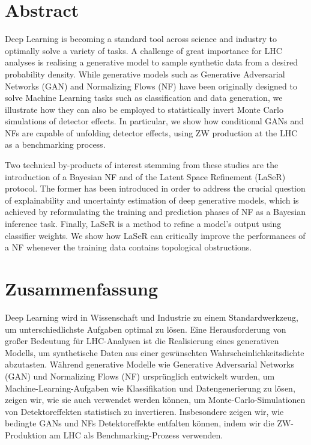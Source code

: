 %
%
\thispagestyle{empty}
%
\vspace*{1cm}
\section*{Abstract}

Deep Learning is becoming a standard tool across science and industry to optimally solve a variety of tasks.
A challenge of great importance for LHC analyses is realising a generative model to sample synthetic data from a desired probability density.
While generative models such as Generative Adversarial Networks (GAN) and Normalizing Flows (NF) have been originally designed to solve Machine Learning tasks such as classification and data generation, we illustrate how they can also be employed to statistically invert Monte Carlo simulations of detector effects. 
In particular, we show how conditional GANs and NFs are capable of unfolding detector effects, using ZW production at the LHC as a benchmarking process.

Two technical by-products of interest stemming from these studies are the introduction of a Bayesian NF and of the Latent Space Refinement (LaSeR) protocol. The former has been introduced in order to address the crucial question of explainability and uncertainty estimation of deep generative models, which is achieved by reformulating the training and prediction phases of NF as a Bayesian inference task. Finally, LaSeR is a method to refine a model's output using classifier weights. We show how LaSeR can critically improve the performances of a NF whenever the training data contains topological obstructions.

\vspace*{2.2cm}
\section*{Zusammenfassung}

Deep Learning wird in Wissenschaft und Industrie zu einem Standardwerkzeug, um unterschiedlichste Aufgaben optimal zu lösen.
Eine Herausforderung von großer Bedeutung für LHC-Analysen ist die Realisierung eines generativen Modells, um synthetische Daten aus einer gewünschten Wahrscheinlichkeitsdichte abzutasten.
Während generative Modelle wie Generative Adversarial Networks (GAN) und Normalizing Flows (NF) ursprünglich entwickelt wurden, um Machine-Learning-Aufgaben wie Klassifikation und Datengenerierung zu lösen, zeigen wir, wie sie auch verwendet werden können, um Monte-Carlo-Simulationen von Detektoreffekten statistisch zu invertieren.
Insbesondere zeigen wir, wie bedingte GANs und NFs Detektoreffekte entfalten können, indem wir die ZW-Produktion am LHC als Benchmarking-Prozess verwenden.


